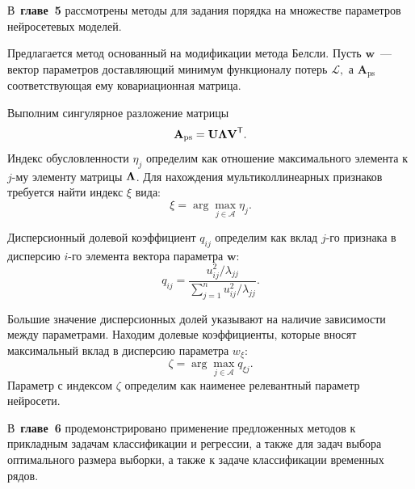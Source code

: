 \documentclass{dissert}
\begin{document}
В~\textbf{главе~5} рассмотрены методы для задания порядка на множестве параметров нейросетевых моделей.

Предлагается метод основанный на модификации метода Белсли. Пусть $\textbf{w}$~--- вектор параметров доставляющий минимум функционалу потерь $\mathcal{L},$ а $\textbf{A}_\text{ps}$ соответствующая ему ковариационная матрица.

Выполним сингулярное разложение матрицы
\[
\textbf{A}_\text{ps} = \textbf{U}{\bf\Lambda}\textbf{V}^\mathsf{T}.
\]
Индекс обусловленности $\eta_{j}$ определим как отношение максимального элемента к $j$-му элементу матрицы ${\bf\Lambda}$. Для нахождения мультиколлинеарных признаков требуется найти индекс $\xi$ вида:
\[
\xi = \arg\max_{j\in \mathcal{A}}{\eta_j}.
\]

Дисперсионный долевой коэффициент $q_{ij}$ определим как вклад $j$-го признака в дисперсию $i$-го элемента вектора параметра $\textbf{w}$:
\[
q_{ij} = \frac{u^2_{ij}/\lambda_{jj}}{\sum^n_{j=1}{u^2_{ij}/\lambda_{jj}}}.
\]

Большие значение дисперсионных долей указывают на наличие зависимости между параметрами. Находим долевые коэффициенты, которые вносят максимальный вклад в дисперсию параметра $w_\xi$:
\[
\zeta = \arg\max_{j\in \mathcal{A}}{q_{\xi j}}.
\]
Параметр с индексом $\zeta$ определим как наименее релевантный параметр нейросети.

В~\textbf{главе~6} продемонстрировано применение предложенных методов к прикладным задачам классификации и регрессии, а также для задач выбора оптимального размера выборки, а также к задаче классификации временных рядов.
\end{document}
